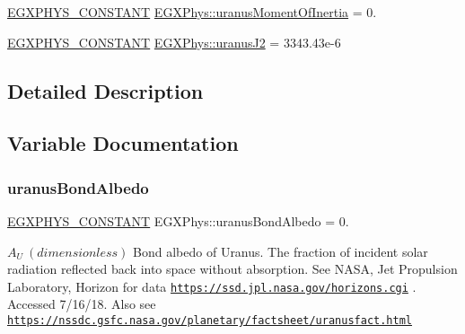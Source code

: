\begin{DoxyCompactItemize}
\item 
\mbox{\hyperlink{group___e_g_x_phys-_constants-_macros_ga76980d288494ce1714c9ac68a95ba702}{E\+G\+X\+P\+H\+Y\+S\+\_\+\+C\+O\+N\+S\+T\+A\+NT}} \mbox{\hyperlink{group___e_g_x_phys-_constants-_astrophysics-_solar_system-_uranus-_bulk_ga26cda1990ca0ac98e925a80c26ee88f5}{E\+G\+X\+Phys\+::uranus\+Moment\+Of\+Inertia}} = 0.
\item 
\mbox{\hyperlink{group___e_g_x_phys-_constants-_macros_ga76980d288494ce1714c9ac68a95ba702}{E\+G\+X\+P\+H\+Y\+S\+\_\+\+C\+O\+N\+S\+T\+A\+NT}} \mbox{\hyperlink{group___e_g_x_phys-_constants-_astrophysics-_solar_system-_uranus-_bulk_ga2b1d23bfe148337be5275b1abd51f97a}{E\+G\+X\+Phys\+::uranus\+J2}} = 3343.\+43e-\/6
\end{DoxyCompactItemize}


\subsection{Detailed Description}


\subsection{Variable Documentation}
\mbox{\label{group___e_g_x_phys-_constants-_astrophysics-_solar_system-_uranus-_bulk_ga0efbea809d5a024652044e18ac4bf0c5}} 
\subsubsection{\texorpdfstring{uranus\+Bond\+Albedo}{uranusBondAlbedo}}
{\footnotesize\ttfamily \mbox{\hyperlink{group___e_g_x_phys-_constants-_macros_ga76980d288494ce1714c9ac68a95ba702}{E\+G\+X\+P\+H\+Y\+S\+\_\+\+C\+O\+N\+S\+T\+A\+NT}} E\+G\+X\+Phys\+::uranus\+Bond\+Albedo = 0.}

$ A_{U} \ (dimensionless)$ Bond albedo of Uranus. The fraction of incident solar radiation reflected back into space without absorption. See N\+A\+SA, Jet Propulsion Laboratory, Horizon for data \href{https://ssd.jpl.nasa.gov/horizons.cgi}{\tt https\+://ssd.\+jpl.\+nasa.\+gov/horizons.\+cgi} . Accessed 7/16/18. Also see \href{https://nssdc.gsfc.nasa.gov/planetary/factsheet/uranusfact.html}{\tt https\+://nssdc.\+gsfc.\+nasa.\+gov/planetary/factsheet/uranusfact.\+html} \mbox{\label{group___e_g_x_phys-_constants-_astrophysics-_solar_system-_uranus-_bulk_gaffdc8522dc72ce6a2c81fbae2720794f}} 
